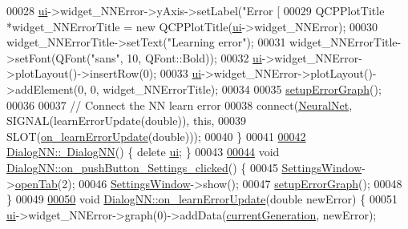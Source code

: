 \begin{DoxyCode}
00028   \hyperlink{class_dialog_n_n_affd6ce2909be5826c52fd862d1963eee}{ui}->widget\_NNError->yAxis->setLabel(\textcolor{stringliteral}{"Error [%
00029   QCPPlotTitle *widget\_NNErrorTitle = \textcolor{keyword}{new} QCPPlotTitle(\hyperlink{class_dialog_n_n_affd6ce2909be5826c52fd862d1963eee}{ui}->widget\_NNError);
00030   widget\_NNErrorTitle->setText(\textcolor{stringliteral}{"Learning error"});
00031   widget\_NNErrorTitle->setFont(QFont(\textcolor{stringliteral}{"sans"}, 10, QFont::Bold));
00032   \hyperlink{class_dialog_n_n_affd6ce2909be5826c52fd862d1963eee}{ui}->widget\_NNError->plotLayout()->insertRow(0);
00033   \hyperlink{class_dialog_n_n_affd6ce2909be5826c52fd862d1963eee}{ui}->widget\_NNError->plotLayout()->addElement(0, 0, widget\_NNErrorTitle);
00034 
00035   \hyperlink{class_dialog_n_n_ae3abaadf57d6614cddb1a9c244da721d}{setupErrorGraph}();
00036 
00037   \textcolor{comment}{// Connect the NN learn error}
00038   connect(\hyperlink{class_dialog_n_n_a1d38f96a8f11697068e805fdaa3267b2}{NeuralNet}, SIGNAL(learnErrorUpdate(\textcolor{keywordtype}{double})), \textcolor{keyword}{this},
00039           SLOT(\hyperlink{class_dialog_n_n_a24e8d08c95de8dd392e81409b9500ab6}{on\_learnErrorUpdate}(\textcolor{keywordtype}{double})));
00040 \}
00041 
\hypertarget{dialognn_8cpp_source_l00042}{}\hyperlink{class_dialog_n_n_a128ab0c8ba3e7a140545eb2dd37f4aab}{00042} \hyperlink{class_dialog_n_n_a128ab0c8ba3e7a140545eb2dd37f4aab}{DialogNN::~DialogNN}() \{ \textcolor{keyword}{delete} \hyperlink{class_dialog_n_n_affd6ce2909be5826c52fd862d1963eee}{ui}; \}
00043 
\hypertarget{dialognn_8cpp_source_l00044}{}\hyperlink{class_dialog_n_n_a4a203b679f42761eae157b445bcfc57d}{00044} \textcolor{keywordtype}{void} \hyperlink{class_dialog_n_n_a4a203b679f42761eae157b445bcfc57d}{DialogNN::on\_pushButton\_Settings\_clicked}() \{
00045   \hyperlink{class_dialog_n_n_aeaad085b1b2c7e4613228aa612d725f4}{SettingsWindow}->\hyperlink{class_dialog_settings_ac22fca3a8ea77953fb667c0118860221}{openTab}(2);
00046   \hyperlink{class_dialog_n_n_aeaad085b1b2c7e4613228aa612d725f4}{SettingsWindow}->show();
00047   \hyperlink{class_dialog_n_n_ae3abaadf57d6614cddb1a9c244da721d}{setupErrorGraph}();
00048 \}
00049 
\hypertarget{dialognn_8cpp_source_l00050}{}\hyperlink{class_dialog_n_n_a24e8d08c95de8dd392e81409b9500ab6}{00050} \textcolor{keywordtype}{void} \hyperlink{class_dialog_n_n_a24e8d08c95de8dd392e81409b9500ab6}{DialogNN::on\_learnErrorUpdate}(\textcolor{keywordtype}{double} newError) \{
00051   \hyperlink{class_dialog_n_n_affd6ce2909be5826c52fd862d1963eee}{ui}->widget\_NNError->graph(0)->addData(\hyperlink{class_dialog_n_n_a886cc6b16f26f822a3a39ed7812f26a5}{currentGeneration}, newError);
}
\end{DoxyCode}
